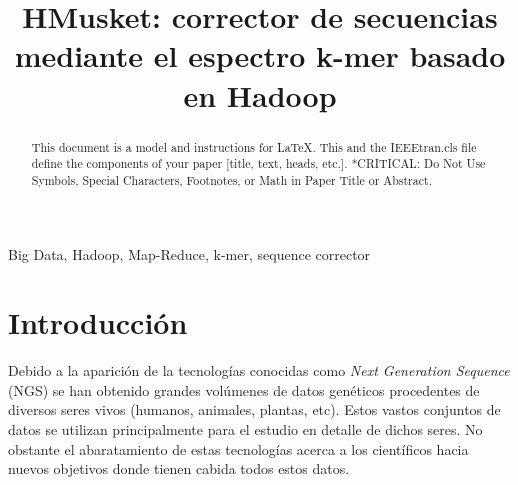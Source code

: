 \documentclass[conference]{IEEEtran}
\begin{document}
\title{HMusket: corrector de secuencias mediante el espectro k-mer basado en Hadoop}

\author{
\and
{}
\and
{}
}

\maketitle

\begin{abstract}
This document is a model and instructions for \LaTeX.
This and the IEEEtran.cls file define the components of your paper [title, text, heads, etc.]. *CRITICAL: Do Not Use Symbols, Special Characters, Footnotes, 
or Math in Paper Title or Abstract.
\end{abstract}

\begin{IEEEkeywords}
Big Data, Hadoop, Map-Reduce, k-mer, sequence corrector
\end{IEEEkeywords}

\section{Introducción}
Debido a la aparición de la tecnologías conocidas como \textit{Next Generation Sequence} (NGS) se han obtenido grandes volúmenes de datos genéticos procedentes de diversos seres vivos (humanos, animales, plantas, etc). Estos vastos conjuntos de datos se utilizan principalmente para el estudio en detalle de dichos seres. 
No obstante el abaratamiento de estas tecnologías acerca a los científicos hacia nuevos objetivos donde tienen cabida todos estos datos.
\\
\end{document}
